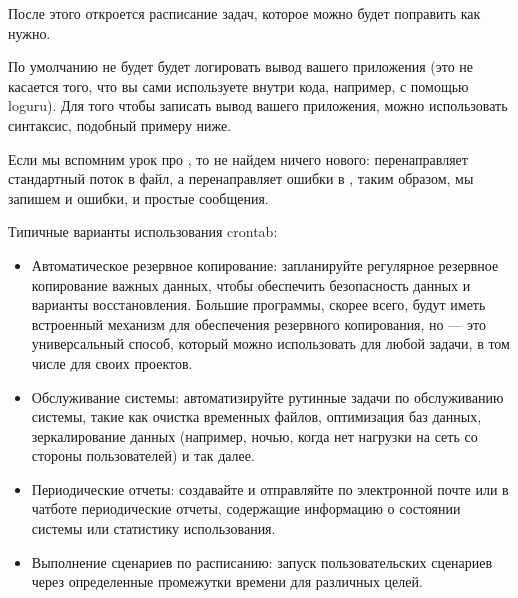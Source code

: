 \documentclass[letterpaper,10pt,russian]{sphinxmanual}
\begin{document}
\sphinxAtStartPar
После этого откроется расписание задач, которое можно будет поправить как нужно.

\sphinxAtStartPar
{}

\sphinxAtStartPar
По умолчанию  не будет будет логировать вывод вашего приложения (это не касается того, что вы сами используете внутри кода, например, с помощью loguru). Для того чтобы записать вывод вашего приложения, можно использовать синтаксис, подобный примеру ниже.

\begin{sphinxVerbatim}[commandchars=\\\{\}]
        
\end{sphinxVerbatim}

\sphinxAtStartPar
Если мы вспомним урок про , то не найдем ничего нового:  перенаправляет стандартный поток  в файл, а  перенаправляет ошибки  в , таким образом, мы запишем и ошибки, и простые сообщения.

\sphinxAtStartPar
Типичные варианты использования crontab:
\begin{itemize}
\item {} 
\sphinxAtStartPar
Автоматическое резервное копирование: запланируйте регулярное резервное копирование важных данных, чтобы обеспечить безопасность данных и варианты восстановления. Большие программы, скорее всего, будут иметь встроенный механизм для обеспечения резервного копирования, но  — это универсальный способ, который можно использовать для любой задачи, в том числе для своих проектов.

\item {} 
\sphinxAtStartPar
Обслуживание системы: автоматизируйте рутинные задачи по обслуживанию системы, такие как очистка временных файлов, оптимизация баз данных, зеркалирование данных (например, ночью, когда нет нагрузки на сеть со стороны пользователей) и так далее.

\item {} 
\sphinxAtStartPar
Периодические отчеты: создавайте и отправляйте по электронной почте или в чат\sphinxhyphen{}боте периодические отчеты, содержащие информацию о состоянии системы или статистику использования.

\item {} 
\sphinxAtStartPar
Выполнение сценариев по расписанию: запуск пользовательских сценариев через определенные промежутки времени для различных целей.

\end{itemize}
\end{document}
